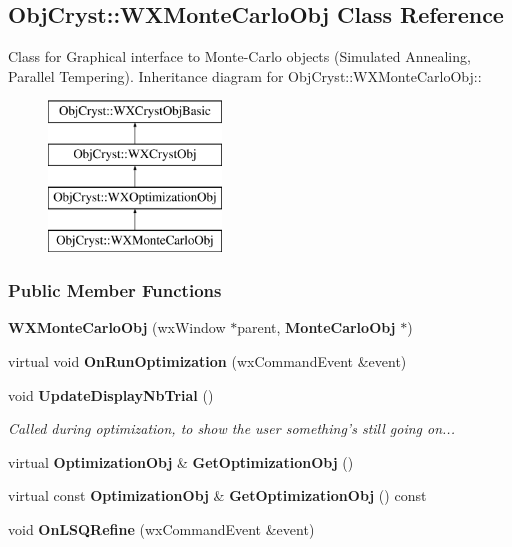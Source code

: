 \subsection{ObjCryst::WXMonteCarloObj Class Reference}
\label{a00132}


Class for Graphical interface to Monte-\/Carlo objects (Simulated Annealing, Parallel Tempering).  
Inheritance diagram for ObjCryst::WXMonteCarloObj::\begin{figure}[H]
\begin{center}
\leavevmode
\includegraphics[height=4cm]{a00132}
\end{center}
\end{figure}
\subsubsection*{Public Member Functions}
\begin{DoxyCompactItemize}
\item 
{\bfseries WXMonteCarloObj} (wxWindow $\ast$parent, {\bf MonteCarloObj} $\ast$)\label{a00132_a7f065d157d74531110e16c7d8081a95c}

\item 
virtual void {\bfseries OnRunOptimization} (wxCommandEvent \&event)\label{a00132_a098a0d500afd4106725f308b4a5938a5}

\item 
void {\bf UpdateDisplayNbTrial} ()\label{a00132_acbceaa3d0ad0a5936d79a4322eca4df3}

\begin{DoxyCompactList}\small\item\em Called during optimization, to show the user something's still going on... \item\end{DoxyCompactList}\item 
virtual {\bf OptimizationObj} \& {\bfseries GetOptimizationObj} ()\label{a00132_a82f53dc7990c736211df87a47c0104eb}

\item 
virtual const {\bf OptimizationObj} \& {\bfseries GetOptimizationObj} () const \label{a00132_a9d58c53f79b831360d3dc09eb8da5213}

\item 
void {\bfseries OnLSQRefine} (wxCommandEvent \&event)\label{a00132_aa7c362490aa3761ae1426f2fe111d622}

\end{DoxyCompactItemize}
